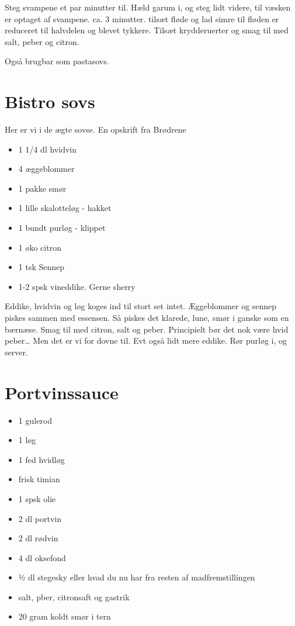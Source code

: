 \documentclass[
]{book}
\providecommand{\tightlist}{%
  \setlength{\itemsep}{0pt}\setlength{\parskip}{0pt}}
\begin{document}
Steg svampene et par minutter til. Hæld garum i, og steg lidt videre, til
væsken er optaget af svampene. ca. 3 minutter.
tilsæt fløde og lad simre til fløden er reduceret til halvdelen og blevet tykkere.
Tilsæt krydderuerter og smag til med salt, peber og citron.

Også brugbar som pastasovs.

\section{Bistro sovs}\label{bistro-sovs}

Her er vi i de ægte sovse. En opskrift fra Brødrene

\begin{itemize}
\tightlist
\item
  1 1/4 dl hvidvin
\item
  4 æggeblommer
\item
  1 pakke smør
\item
  1 lille skalotteløg - hakket
\item
  1 bundt purløg - klippet
\item
  1 øko citron
\item
  1 tsk Sennep
\item
  1-2 spsk vineddike. Gerne sherry
\end{itemize}

Eddike, hvidvin og løg koges ind til stort set intet.
Æggeblommer og sennep piskes sammen med essensen. Så piskes det klarede,
lune, smør i ganske som en bærnæse. Smag til med citron, salt og peber.
Principielt bør det nok være hvid peber\ldots{} Men det er vi for dovne til.
Evt også lidt mere eddike.
Rør purløg i, og server.

\section{Portvinssauce}\label{portvinssauce}

\begin{itemize}
\tightlist
\item
  1 gulerod
\item
  1 løg
\item
  1 fed hvidløg
\item
  frisk timian
\item
  1 spsk olie
\item
  2 dl portvin
\item
  2 dl rødvin
\item
  4 dl oksefond
\item
  ½ dl stegesky eller hvad du nu har fra resten af madfremstillingen
\item
  salt, pber, citronsaft og gastrik
\item
  20 gram koldt smør i tern
\end{itemize}
\end{document}
